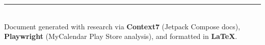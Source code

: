 \documentclass[12pt,a4paper]{article}
\begin{document}
\vfill
\begin{center}
\textcolor{primary}{\rule{0.5\textwidth}{0.4pt}}\\[6pt]
{\small Document generated with research via \textbf{Context7} (Jetpack Compose docs),\\
\textbf{Playwright} (MyCalendar Play Store analysis), and formatted in \textbf{\LaTeX}.}
\end{center}
\end{document}
